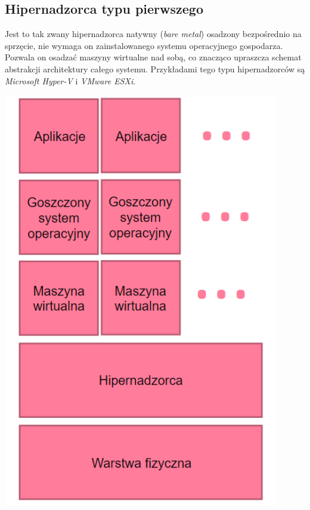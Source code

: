 \documentclass[polish, a4paper, 12pt, oneside]{book}
\begin{document}
	\subsection {Hipernadzorca typu pierwszego} 
	Jest to tak zwany hipernadzorca natywny (\textit{bare metal}) osadzony bezpośrednio na sprzęcie, nie wymaga on zainstalowanego systemu operacyjnego gospodarza. Pozwala on osadzać maszyny wirtualne nad sobą, co znacząco upraszcza schemat abstrakcji architektury całego systemu. Przykładami tego typu hipernadzorców są \textit{Microsoft Hyper-V}\cite{hyperv} i \textit{VMware ESXi}\cite{vmwareesx}.
	\begin{center}
		\includegraphics[width=120mm]{schemat_hiper1.png}
	\end{center}
	
\end{document}
